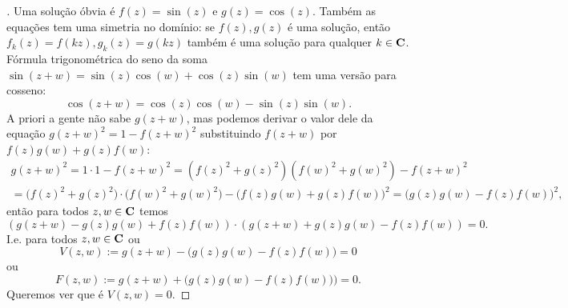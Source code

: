 \pnove*
\begin{proof}[]

Uma solução óbvia é $f(z) = \sin(z)$ e $g(z) =\cos(z)$.
Também as equações tem uma simetria no domínio:
se $f(z),g(z)$ é uma solução, então $f_k(z) = f(kz), g_k(z) = g(kz)$
também é uma solução para qualquer $k\in\mathbf{C}$.
Fórmula trigonométrica do seno da soma
$\sin(z+w) = \sin(z) \cos(w) + \cos(z) \sin(w)$
tem uma versão para cosseno:
\[ \cos(z+w) = \cos(z)\cos(w) - \sin(z)\sin(w). \]
A priori a gente não sabe $g(z+w)$, mas podemos derivar o valor dele
da equação $g(z+w)^2 = 1 - f(z+w)^2$ substituindo $f(z+w)$
por $f(z)g(w)+g(z)f(w)$:
\begin{multline*}
g(z+w)^2 = 1\cdot 1 - f(z+w)^2 = (f(z)^2+g(z)^2)(f(w)^2+g(w)^2) - f(z+w)^2
\\ = \big(f(z)^2+g(z)^2\big)\cdot\big(f(w)^2+g(w)^2\big) - \big(f(z)g(w)+g(z)f(w)\big)^2
   = \big(g(z)g(w)-f(z)f(w)\big)^2,
\end{multline*}
então para todos $z,w\in\mathbf{C}$ temos
\[ (g(z+w)-g(z)g(w)+f(z)f(w)) \cdot (g(z+w) + g(z)g(w)-f(z)f(w)) = 0. \]
I.e. para todos $z,w\in\mathbf{C}$ ou
\[ V(z,w) := g(z+w) - \big(g(z)g(w) - f(z)f(w)\big) = 0 \]
ou 
\[ F(z,w) := g(z+w) + \big(g(z)g(w)-f(z)f(w))\big) = 0. \]
Queremos ver que é $V(z,w)=0$.

\end{proof}
